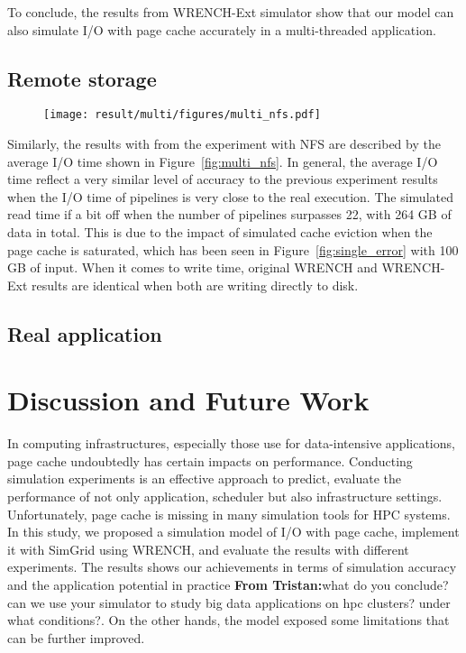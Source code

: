 \documentclass[conference]{IEEEtran}
\newcommand{\tristan}[1]{\color{orange}\textbf{From Tristan:}#1\color{black}}
\begin{document}
			To conclude, the results from WRENCH-Ext simulator show that 
			our model can also simulate I/O with page cache accurately in a 
			multi-threaded application.  
			
		\subsection{Remote storage}
		
			\begin{figure*}		
			\begin{subfigure}{\linewidth}
				\centering
   				\texttt{[image: result/multi/figures/multi\_nfs.pdf]}
			\end{subfigure}		
			\caption{I/O time of concurrent pipelines with NFS}
			\label{fig:multi_nfs}
			\end{figure*}
		
			Similarly, the results with from the experiment with NFS are described 
			by the average I/O time shown in Figure~\ref{fig:multi_nfs}.
			In general, the average I/O time reflect a very similar level of accuracy 
			to the previous experiment results when the I/O time of pipelines 
			is very close to the real execution. 
			The simulated read time if a bit off when the number of pipelines 
			surpasses 22, with 264 GB of data in total. 
			This is due to the impact of simulated cache eviction when 
			the page cache is saturated, which has been seen in 
			Figure~\ref{fig:single_error} with 100 GB of input. 
			When it comes to write time, original WRENCH and WRENCH-Ext 
			results are identical when both are writing directly to disk.
		
		\subsection{Real application}

	\section{Discussion and Future Work}
	\label{discussion}			
			In computing infrastructures, especially those use for data-intensive applications, 
			page cache undoubtedly has certain impacts on performance. 
			Conducting simulation experiments is an effective approach to predict, 
			evaluate the performance of not only application, scheduler but also 
			infrastructure settings. 
			Unfortunately, page cache is missing in many simulation tools for HPC systems. 
			In this study, we proposed a simulation model of I/O with page cache, 
			implement it with SimGrid using WRENCH, and evaluate the results 
			with different experiments. 
			The results shows our achievements in terms of simulation accuracy 
			and the application potential in practice \tristan{what do you conclude? can we use your simulator to study big data applications on hpc clusters? under what conditions?}. 
			On the other hands, the model exposed some limitations that can be 
			further improved.
			
\end{document}
